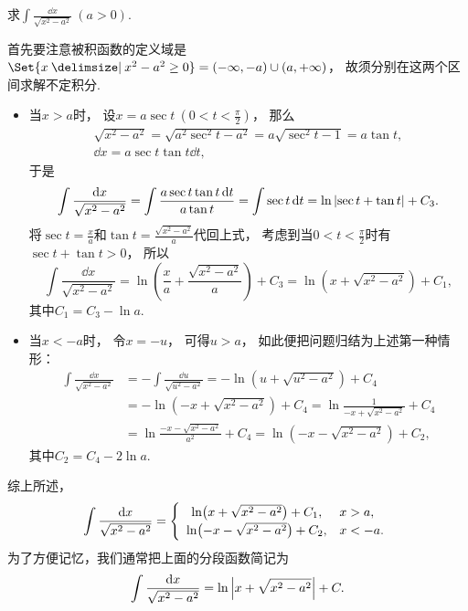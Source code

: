 \begin{example}
求\(\int \frac{\dd{x}}{\sqrt{x^2 - a^2}}\ (a>0)\).
\begin{solution}
首先要注意被积函数的定义域是\(\Set{ x \given x^2-a^2\geq0 }=(-\infty,-a)\cup(a,+\infty)\)，
故须分别在这两个区间求解不定积分.

\begin{itemize}
	\item 当\(x > a\)时，
	设\(x = a \sec t\ (0 < t < \frac\pi2)\)，
	那么\begin{gather*}
		\sqrt{x^2 - a^2} = \sqrt{a^2 \sec^2 t - a^2} = a \sqrt{\sec^2 t - 1} = a \tan t, \\
		\dd{x} = a \sec t \tan t \dd{t},
	\end{gather*}
	于是\begin{equation*}
		\int \frac{\dd{x}}{\sqrt{x^2 - a^2}}
		= \int \frac{a \sec t \tan t \dd{t}}{a \tan t}
		= \int \sec t \dd{t}
		= \ln\abs{\sec t + \tan t} + C_3.
	\end{equation*}
	将\(\sec t = \frac{x}{a}\)和\(\tan t = \frac{\sqrt{x^2-a^2}}{a}\)代回上式，
	考虑到当\(0<t<\frac\pi2\)时有\(\sec t + \tan t > 0\)，
	所以\begin{equation*}
		\int \frac{\dd{x}}{\sqrt{x^2 - a^2}}
		= \ln( \frac{x}{a} + \frac{\sqrt{x^2 - a^2}}{a} ) + C_3
		= \ln( x + \sqrt{x^2 - a^2} ) + C_1,
	\end{equation*}
	其中\(C_1 = C_3 - \ln a\).

	\item 当\(x < -a\)时，
	令\(x = -u\)，
	可得\(u > a\)，
	如此便把问题归结为上述第一种情形：\begin{align*}
		\int \frac{\dd{x}}{\sqrt{x^2 - a^2}}
		&= -\int \frac{\dd{u}}{\sqrt{u^2 - a^2}}
		= -\ln(u + \sqrt{u^2 - a^2}) + C_4 \\
		&= -\ln(-x + \sqrt{x^2 - a^2}) + C_4
		= \ln\frac1{-x + \sqrt{x^2 - a^2}} + C_4 \\
		&= \ln\frac{-x - \sqrt{x^2 - a^2}}{a^2} + C_4
		= \ln(-x - \sqrt{x^2 - a^2}) + C_2,
	\end{align*}
	其中\(C_2 = C_4 - 2 \ln a\).
\end{itemize}
综上所述，\begin{equation}
	\int \frac{\dd{x}}{\sqrt{x^2 - a^2}}
	= \left\{ \def\arraystretch{1.2} \begin{array}{cl}
		\ln(x+\sqrt{x^2-a^2}) + C_1, & x>a, \\
		\ln(-x-\sqrt{x^2-a^2}) + C_2, & x<-a.
	\end{array} \right.
\end{equation}
为了方便记忆，我们通常把上面的分段函数简记为\begin{equation}
	\int \frac{\dd{x}}{\sqrt{x^2 - a^2}}
	= \ln\abs{x + \sqrt{x^2 - a^2}} + C.
\end{equation}
\end{solution}
\end{example}

